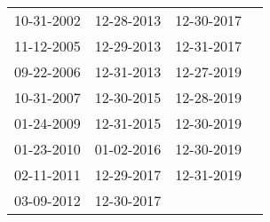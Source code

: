\begin{supertabular}{llll}
 10-31-2002 &  12-28-2013 &  12-30-2017 \\
 11-12-2005 &  12-29-2013 &  12-31-2017 \\
 09-22-2006 &  12-31-2013 &  12-27-2019 \\
 10-31-2007 &  12-30-2015 &  12-28-2019 \\
 01-24-2009 &  12-31-2015 &  12-30-2019 \\
 01-23-2010 &  01-02-2016 &  12-30-2019 \\
 02-11-2011 &  12-29-2017 &  12-31-2019 \\
 03-09-2012 &  12-30-2017 &             \\
\end{supertabular}
